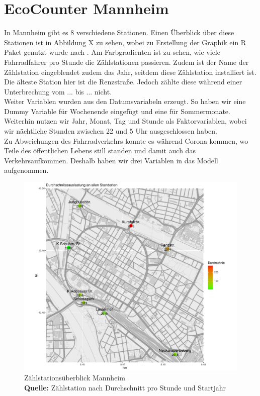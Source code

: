 \documentclass[a4paper,12pt]{thesis}
\newcommand*{\captionsource}[2]{%
	\caption[{#1}]{%
		#1%
		\\\hspace{\linewidth}%
		\textbf{Quelle:} #2%
	}%
}
\begin{document}
\section{EcoCounter Mannheim}

In Mannheim gibt es 8 verschiedene Stationen. Einen Überblick über diese Stationen ist in Abbildung X zu sehen, wobei zu Erstellung der Graphik ein R Paket genutzt wurde nach \cite{Kahle2013}. Am Farbgradienten ist zu sehen, wie viele Fahrradfahrer pro Stunde die Zählstationen passieren. Zudem ist der Name der Zählstation eingeblendet zudem das Jahr, seitdem diese Zählstation installiert ist. Die älteste Station hier ist die Renzstraße. Jedoch zählte diese während einer Unterbrechung vom ... bis ... nicht.\\
Weiter Variablen wurden aus den Datumsvariabeln erzeugt. So haben wir eine Dummy Variable für Wochenende eingefügt und eine für Sommermonate. Weiterhin nutzen wir Jahr, Monat, Tag und Stunde als Faktorvariablen, wobei wir nächtliche Stunden zwischen 22 und 5 Uhr ausgeschlossen haben.\\
Zu Abweichungen des Fahrradverkehrs konnte es während Corona kommen, wo Teile des öffentlichen Lebens still standen und damit auch das Verkehrsaufkommen. Deshalb haben wir drei Variablen in das Modell aufgenommen.

\begin{figure}[!ht]
	\centering
	\includegraphics[width=\textwidth]{Plots/Karte_Durchschnittsauslastung.pdf}
	\captionsource{Zählstationsüberblick Mannheim}{
		Zählstation nach Durchschnitt pro Stunde und Startjahr
	}
	\label{fig:meine-grafik5}
\end{figure}
\end{document}
